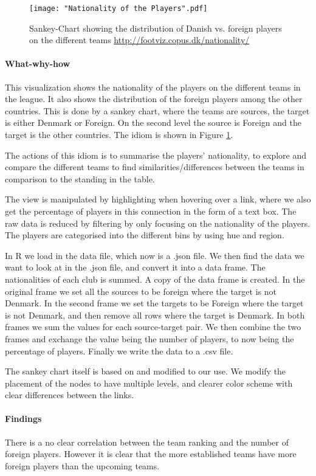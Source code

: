 \documentclass[Report.tex]{subfiles}
\begin{document}
\begin{figure}
\center
\texttt{[image: "Nationality of the Players".pdf]}
\caption{Sankey-Chart showing the distribution of Danish vs. foreign players on the different teams \url{http://footviz.copus.dk/nationality/}}
\label{Fig:Nationality}
\end{figure}


\paragraph{What-why-how\\}

This visualization shows the nationality of the players on the different teams in the league. It also shows the distribution of the foreign players among the other countries. This is done by a sankey chart, where the teams are sources, the target is either Denmark or Foreign. On the second level the source is Foreign and the target is the other countries. The idiom is shown in Figure \ref{Fig:Nationality}.

The actions of this idiom is to summarise the players' nationality, to explore and compare the different teams to find similarities/differences between the teams in comparison to the standing in the table. 

The view is manipulated by highlighting when hovering over a link, where we also get the percentage of players in this connection in the form of a text box. The raw data is reduced by filtering by only focusing on the nationality of the players. The players are categorised into the different bins by using hue and region.

In R we load in the data file, which now is a .json file. We then find the data we want to look at in the .json file, and convert it into a data frame. The nationalities of each club is summed. A copy of the data frame is created. In the original frame we set all the sources to be foreign where the target is not Denmark. In the second frame we set the targets to be Foreign where the target is not Denmark, and then remove all rows where the target is Denmark. In both frames we sum the values for each source-target pair. We then combine the two frames and exchange the value being the number of players, to now being the percentage of players. Finally we write the data to a .csv file.

The sankey chart itself is based on \cite{Sankey} and modified to our use. We modify the placement of the nodes to have multiple levels, and clearer color scheme with clear differences between the links.
\paragraph{Findings\\}
There is a no clear correlation between the team ranking and the number of foreign players. However it is clear that the more established teams have more foreign players than the upcoming teams.
\end{document}
